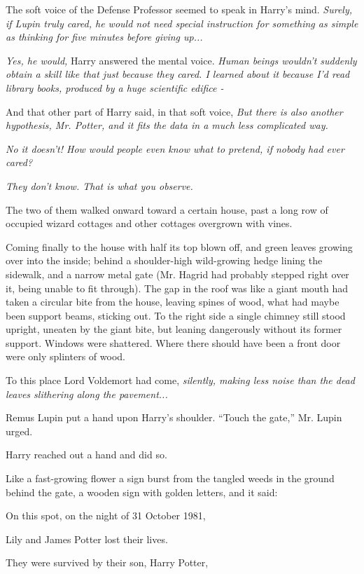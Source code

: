 The soft voice of the Defense Professor seemed to speak in Harry's mind.
\emph{Surely, if Lupin truly cared, he would not need special
instruction for something as simple as thinking for five minutes before
giving up...}

\emph{Yes, he would,} Harry answered the mental voice. \emph{Human
beings wouldn't suddenly obtain a skill like that just because they
cared. I learned about it because I'd read library books, produced by a
huge scientific edifice -}

And that other part of Harry said, in that soft voice, \emph{But there
is also another hypothesis, Mr. Potter, and it fits the data in a much
less complicated way.}

\emph{No it doesn't! How would people even know what to pretend, if
nobody had ever cared?}

\emph{They don't know. That is what you observe.}

The two of them walked onward toward a certain house, past a long row of
occupied wizard cottages and other cottages overgrown with vines.

Coming finally to the house with half its top blown off, and green
leaves growing over into the inside; behind a shoulder-high wild-growing
hedge lining the sidewalk, and a narrow metal gate (Mr. Hagrid had
probably stepped right over it, being unable to fit through). The gap in
the roof was like a giant mouth had taken a circular bite from the
house, leaving spines of wood, what had maybe been support beams,
sticking out. To the right side a single chimney still stood upright,
uneaten by the giant bite, but leaning dangerously without its former
support. Windows were shattered. Where there should have been a front
door were only splinters of wood.

To this place Lord Voldemort had come, \emph{silently, making less noise
than the dead leaves slithering along the pavement...}

Remus Lupin put a hand upon Harry's shoulder. ``Touch the gate,'' Mr.
Lupin urged.

Harry reached out a hand and did so.

Like a fast-growing flower a sign burst from the tangled weeds in the
ground behind the gate, a wooden sign with golden letters, and it said:

On this spot, on the night of 31 October 1981,

Lily and James Potter lost their lives.

They were survived by their son, Harry Potter,

